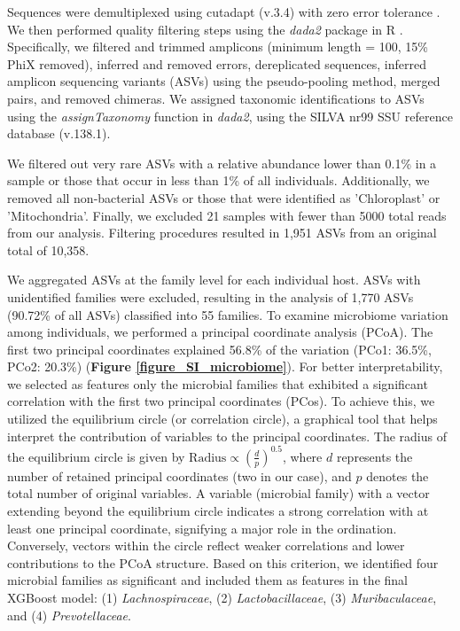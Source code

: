 \documentclass[oneside, a4paper, onecolumn, 11pt]{article}
\begin{document}
Sequences were demultiplexed using cutadapt (v.3.4) with zero error tolerance \citep{Martin2011-yj}. We then performed quality filtering steps using the \textit{dada2} package in R \citep{Callahan2016-wj}. Specifically, we filtered and trimmed amplicons (minimum length = 100, 15\% PhiX removed), inferred and removed errors, dereplicated sequences, inferred amplicon sequencing variants (ASVs) using the pseudo-pooling method, merged pairs, and removed chimeras. We assigned taxonomic identifications to ASVs using the \textit{assignTaxonomy} function in \textit{dada2}, using the SILVA nr99 SSU reference database (v.138.1).

We filtered out very rare ASVs with a relative abundance lower than 0.1\% in a sample or those that occur in less than 1\% of all individuals. Additionally, we removed all non-bacterial ASVs or those that were identified as 'Chloroplast' or 'Mitochondria'. Finally, we excluded 21 samples with fewer than 5000 total reads from our analysis. Filtering procedures resulted in 1,951 ASVs from an original total of 10,358. 

We aggregated ASVs at the family level for each individual host. ASVs with unidentified families were excluded, resulting in the analysis of 1,770 ASVs (90.72\% of all ASVs) classified into 55 families. To examine microbiome variation among individuals, we performed a principal coordinate analysis (PCoA). The first two principal coordinates explained 56.8\% of the variation (PCo1: 36.5\%, PCo2: 20.3\%) (\textbf{Figure \ref{figure_SI_microbiome}}). For better interpretability, we selected as features only the microbial families that exhibited a significant correlation with the first two principal coordinates (PCos). To achieve this, we utilized the equilibrium circle (or correlation circle), a graphical tool that helps interpret the contribution of variables to the principal coordinates. The radius of the equilibrium circle is given by $\text{Radius} \propto \left(\frac{d}{p}\right)^{0.5}$, where $d$ represents the number of retained principal coordinates (two in our case), and $p$ denotes the total number of original variables. A variable (microbial family) with a vector extending beyond the equilibrium circle indicates a strong correlation with at least one principal coordinate, signifying a major role in the ordination. Conversely, vectors within the circle reflect weaker correlations and lower contributions to the PCoA structure. Based on this criterion, we identified four microbial families as significant and included them as features in the final XGBoost model: (1) \textit{Lachnospiraceae}, (2) \textit{Lactobacillaceae}, (3) \textit{Muribaculaceae}, and (4) \textit{Prevotellaceae}.
\end{document}
